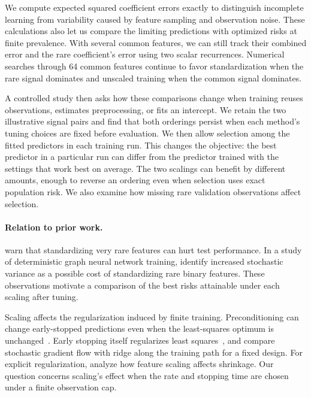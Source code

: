 \documentclass{alt2027}
\begin{document}
We compute expected squared coefficient errors exactly to distinguish incomplete
learning from variability caused by feature sampling and observation noise.
These calculations also let us compare the limiting predictions with optimized
risks at finite prevalence. With several common features, we can still track
their combined error and the rare coefficient's error using two scalar
recurrences. Numerical searches through 64 common features continue to favor
standardization when the rare signal dominates and unscaled training when the
common signal dominates.

A controlled study then asks how these comparisons change when training reuses
observations, estimates preprocessing, or fits an intercept. We retain the two
illustrative signal pairs and find that both orderings persist when each
method's tuning choices are fixed before evaluation. We then allow selection
among the fitted predictors in each training run. This changes the objective:
the best predictor in a particular run can differ from the predictor trained
with the settings that work best on average. The two scalings can benefit by
different amounts, enough to reverse an ordering even when selection uses exact
population risk. We also examine how missing rare validation observations affect
selection.

\paragraph{Relation to prior work.}

\citet[Section 5.4]{bordes2010erratum} warn that standardizing very rare
features can hurt test performance. In a study of deterministic graph neural
network training, \citet[Section 5]{milligan2024normalization} identify
increased stochastic variance as a possible cost of standardizing rare binary
features. These observations motivate a comparison of the best risks attainable
under each scaling after tuning.

Scaling affects the regularization induced by finite training. Preconditioning
can change early-stopped predictions even when the least-squares optimum is
unchanged~\citep{wadia2021whitening}. Early stopping itself regularizes least
squares~\citep{ali2019early}, and \citet{ali2020stochastic} compare stochastic
gradient flow with ridge along the training path for a fixed design. For
explicit regularization, \citet{larsson2025normalization} analyze how feature
scaling affects shrinkage. Our question concerns scaling's effect when the rate
and stopping time are chosen under a finite observation cap.
\end{document}
